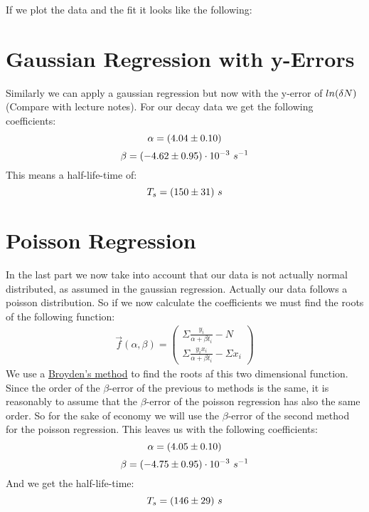 \documentclass[11pt]{article}
\begin{document}
    If we plot the data and the fit it looks like the following:
    
    
    
    \pagebreak

    \section{Gaussian Regression with y-Errors}
    Similarly we can apply a gaussian regression but now with the y-error of $ln(\delta N)$ (Compare with lecture notes).
    For our decay data we get the following coefficients:
    \begin{equation*}
        \alpha = (4.04 \pm 0.10)
    \end{equation*}
    \begin{equation*}
        \beta = (-4.62 \pm 0.95) \cdot 10^{-3}\ s^{-1}
    \end{equation*}
    This means a half-life-time of:
    \begin{equation*}
        T_s = (150 \pm 31)\ s
    \end{equation*}

    \section{Poisson Regression}
    In the last part we now take into account that our data is not actually normal distributed, as assumed in the 
    gaussian regression.
    Actually our data follows a poisson distribution.
    So if we now calculate the coefficients we must find the roots of the following function:
    \begin{align*}
       \vec{f}(\alpha,\beta) = 
        \begin{pmatrix}
            \Sigma \frac{y_i}{\alpha + \beta t_i} - N \\
            \Sigma \frac{y_i x_i}{\alpha + \beta t_i} - \Sigma x_i
        \end{pmatrix}
    \end{align*}
    We use a \href{https://en.wikipedia.org/wiki/Broyden%27s_method}{Broyden's method} to find the roots af this two
    dimensional function. 
    Since the order of the $\beta$-error of the previous to methods is the same, it is
    reasonably to assume that the $\beta$-error of the poisson regression has also the same order.
    So for the sake of economy we will use the $\beta$-error of the second method for the poisson regression.
    This leaves us with the following coefficients:
    \begin{equation*}
        \alpha = (4.05 \pm 0.10)
    \end{equation*}
    \begin{equation*}
        \beta = (-4.75 \pm 0.95) \cdot 10^{-3}\ s^{-1}
    \end{equation*}
    And we get the half-life-time:
    \begin{equation*}
        T_s = (146 \pm 29)\ s
    \end{equation*}
    
\end{document}
